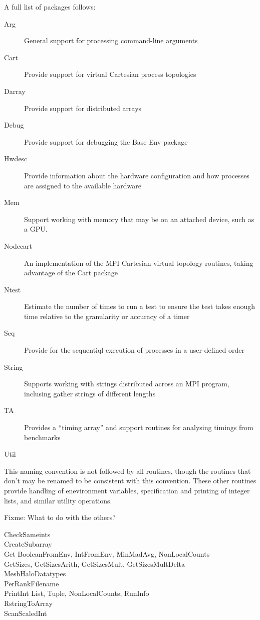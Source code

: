 \documentclass[11pt,letterpaper]{report}
\begin{document}
A full list of packages follows:
\begin{description}
\item[Arg]General support for processing command-line arguments
\item[Cart]Provide support for virtual Cartesian process topologies
\item[Darray]Provide support for distributed arrays
\item[Debug]Provide support for debugging the Base Env package
\item[Hwdesc]Provide information about the hardware configuration and
  how processes are assigned to the available hardware
\item[Mem]Support working with memory that may be on an attached
  device, such as a GPU.
\item[Nodecart]An implementation of the MPI Cartesian virtual topology
  routines, taking advantage of the Cart package
\item[Ntest]Estimate the number of times to run a test to ensure the
  test takes enough time relative to the granularity or accuracy of a timer
\item[Seq]Provide for the sequentiql execution of processes in a
  user-defined order
\item[String]Supports working with strings distributed across an MPI
  program, inclusing gather strings of different lengths
\item[TA]Provides a ``timing array'' and support routines for
  analysing timings from benchmarks
\item[Util]
\end{description}

This naming convention is not followed by all routines, though the
routines that don't may be renamed to be consistent with this
convention.
These other routines provide handling of enevironment variables,
specification and printing of integer lists, and similar utility operations.

       Fixme: What to do with the others?
\begin{obeylines}
       CheckSameints
       CreateSubarray
       Get BooleanFromEnv, IntFromEnv, MinMadAvg, NonLocalCounts
       GetSizes, GetSizesArith, GetSizesMult, GetSizesMultDelta
       MeshHaloDatatypes
       PerRankFilename
       PrintInt List, Tuple, NonLocalCounts, RunInfo
       RstringToArray
       ScanScaledInt
\end{obeylines}
\end{document}
